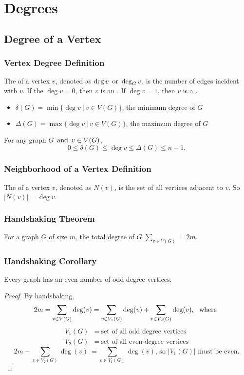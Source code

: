 \section{Degrees}

\subsection{Degree of a Vertex}

\subsubsection*{Vertex Degree Definition}
The  of a vertex $v$, denoted as $\deg v \operatorname{~\text{or}~} \deg_G v$, is the number of edges incident with $v$. If the $\deg v = 0$, then $v$ is an . If $\deg v = 1$, then $v$ is a .
\begin{itemize}
    \item $\delta(G) = \min\{\deg v ~|~ v \in V(G)\}$, the minimum degree of $G$
    \item $\Delta(G) = \max\{\deg v ~|~ v \in V(G)\}$, the maximum degree of $G$
\end{itemize}
For any graph $G \operatorname{~\text{and}~} v \in V(G)$,
\[
    0 \leq \delta(G) \leq \deg v \leq \Delta(G) \leq n-1.
\]

\subsubsection*{Neighborhood of a Vertex Definition}
The  of a vertex $v$, denoted as $N(v)$, is the set of all vertices adjacent to $v$. So $\lvert N(v) \rvert = \deg v$.

\subsubsection*{Handshaking Theorem}
For a graph $G$ of size $m$, the total degree of $G$ $\sum_{v \in V(G)} = 2m$.

\subsubsection*{Handshaking Corollary}
Every graph has an even number of odd degree vertices.
\begin{proof}
    By handshaking,
    \[
        2m = \sum_{v \in V(G)} \deg(v) = \sum_{v \in V_1(G)} \deg(v) + \sum_{v \in V_2(G)} \deg(v),~\operatorname{~\text{where}~}
    \]
    \begin{align*}
        V_1(G) & = ~\text{set of all odd degree vertices}  \\
        V_2(G) & = ~\text{set of all even degree vertices}
    \end{align*}
    \[
        2m - \sum_{v \in V_2(G)} \deg(v) ~= \sum_{v \in V_1(G)} \deg(v) \text{,  so $|V_1(G)|$ must be even}.
    \]
\end{proof}

